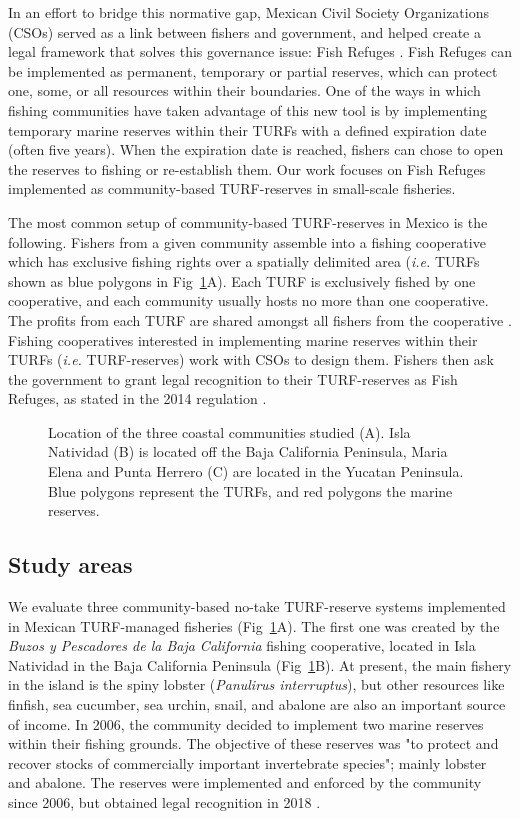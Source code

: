 \documentclass[10pt,letterpaper]{article}
\begin{document}
In an effort to bridge this normative gap, Mexican Civil Society Organizations (CSOs) served as a link between fishers and government, and helped create a legal framework that solves this governance issue: Fish Refuges \cite{nom}. Fish Refuges can be implemented as permanent, temporary or partial reserves, which can protect one, some, or all resources within their boundaries. One of the ways in which fishing communities have taken advantage of this new tool is by implementing temporary marine reserves within their TURFs with a defined expiration date (often five years). When the expiration date is reached, fishers can chose to open the reserves to fishing or re-establish them. Our work focuses on Fish Refuges implemented as community-based TURF-reserves in small-scale fisheries.

The most common setup of community-based TURF-reserves in Mexico is the following. Fishers from a given community assemble into a fishing cooperative which has exclusive fishing rights over a spatially delimited area (\emph{i.e.} TURFs shown as blue polygons in Fig~\ref{fig:map}A). Each TURF is exclusively fished by one cooperative, and each community usually hosts no more than one cooperative. The profits from each TURF are shared amongst all fishers from the cooperative \cite{mccay_2014,mccay_2017}. Fishing cooperatives interested in implementing marine reserves within their TURFs (\emph{i.e.} TURF-reserves) work with CSOs to design them. Fishers then ask the government to grant legal recognition to their TURF-reserves as Fish Refuges, as stated in the 2014 regulation \cite{nom}.

\begin{figure}[!h]
\centering
\caption{Location of the three coastal communities studied (A). Isla Natividad (B) is located off the Baja California Peninsula, Maria Elena and Punta Herrero (C) are located in the Yucatan Peninsula. Blue polygons represent the TURFs, and red polygons the marine reserves.}
\label{fig:map}
\end{figure}

\subsection*{Study areas}

We evaluate three community-based no-take TURF-reserve systems implemented in Mexican TURF-managed fisheries (Fig~\ref{fig:map}A). The first one was created by the \emph{Buzos y Pescadores de la Baja California} fishing cooperative, located in Isla Natividad in the Baja California Peninsula (Fig~\ref{fig:map}B). At present, the main fishery in the island is the spiny lobster (\emph{Panulirus interruptus}), but other resources like finfish, sea cucumber, sea urchin, snail, and abalone are also an important source of income. In 2006, the community decided to implement two marine reserves within their fishing grounds. The objective of these reserves was "to protect and recover stocks of commercially important invertebrate species"; mainly lobster and abalone. The reserves were implemented and enforced by the community since 2006, but obtained legal recognition in 2018 \cite{dof_website_2018}.
\end{document}
